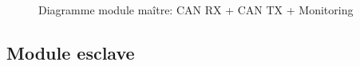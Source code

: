 		\begin{figure}[H]
			\centering
			\caption{Diagramme module maître: CAN RX + CAN TX + Monitoring }
			\label{fig:diagrammefonctionnelcanmonitoring}
		\end{figure}
			
	\subsection{Module esclave}
	
